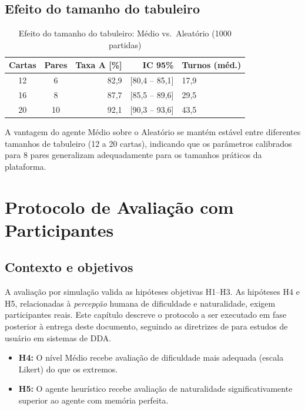 \documentclass[
    12pt,
    openright,
    twoside,
    a4paper,
    english,
    brazil
]{abntex2}
\begin{document}
\section{Efeito do tamanho do tabuleiro}

\begin{table}[htb]
\centering
\caption{Efeito do tamanho do tabuleiro: Médio vs.\ Aleatório (1000 partidas)}
\label{tab:tabuleiro}
\begin{tabular}{ccrrl}
\toprule
\textbf{Cartas} & \textbf{Pares} & \textbf{Taxa A [\%]} & \textbf{IC 95\%} & \textbf{Turnos (méd.)} \\
\midrule
12 & 6  & 82,9 & [80,4 -- 85,1] & 17,9 \\
16 & 8  & 87,7 & [85,5 -- 89,6] & 29,5 \\
20 & 10 & 92,1 & [90,3 -- 93,6] & 43,5 \\
\bottomrule
\end{tabular}
\end{table}

A vantagem do agente Médio sobre o Aleatório se mantém estável entre diferentes tamanhos de tabuleiro (12 a 20 cartas), indicando que os parâmetros calibrados para 8 pares generalizam adequadamente para os tamanhos práticos da plataforma.

\chapter{Protocolo de Avaliação com Participantes}

\section{Contexto e objetivos}

A avaliação por simulação valida as hipóteses objetivas H1--H3. As hipóteses H4 e H5, relacionadas à \textit{percepção} humana de dificuldade e naturalidade, exigem participantes reais. Este capítulo descreve o protocolo a ser executado em fase posterior à entrega deste documento, seguindo as diretrizes de  para estudos de usuário em sistemas de DDA.

\begin{itemize}
  \item \textbf{H4:} O nível Médio recebe avaliação de dificuldade mais adequada (escala Likert) do que os extremos.
  \item \textbf{H5:} O agente heurístico recebe avaliação de naturalidade significativamente superior ao agente com memória perfeita.
\end{itemize}
\end{document}
